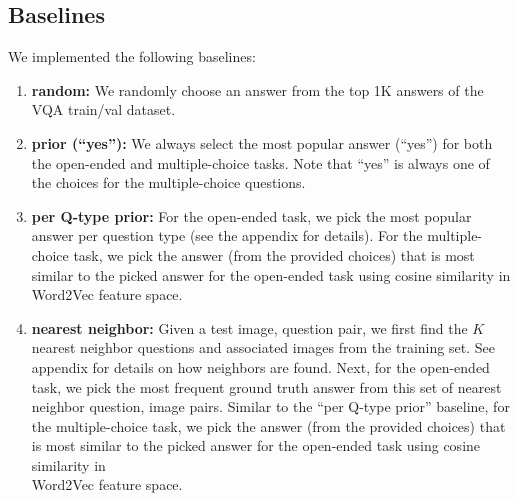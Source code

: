 \subsection{Baselines}
\label{sec:baselinesmain}
We implemented the following baselines:
\begin{enumerate}
\item \textbf{random:} We randomly choose an answer from the top 1K answers of the VQA train/val dataset.

\item \textbf{prior (``yes''):} We always select the most popular answer (``yes'') for both the open-ended and multiple-choice tasks. Note that ``yes'' is always one of the choices for the multiple-choice questions.

\item \textbf{per Q-type prior:} For the open-ended task, we pick the most popular answer per question type (see the appendix for details). For the multiple-choice task, we pick the answer (from the provided choices) that is most similar to the picked answer for the open-ended task using cosine similarity in Word2Vec\cite{word2vec} feature space.

\item \textbf{nearest neighbor:} Given a test image, question pair, we first find the $K$ nearest neighbor questions and associated images from the training set. See appendix for details on how neighbors are found. Next, for the open-ended task, we pick the most frequent ground truth answer from this set of nearest neighbor question, image pairs. Similar to the ``per Q-type prior'' baseline, for the multiple-choice task, we pick the answer (from the provided choices) that is most similar to the picked answer for the open-ended task using cosine similarity in \\ Word2Vec\cite{word2vec} feature space.
\end{enumerate}

\vspace{-5pt}

